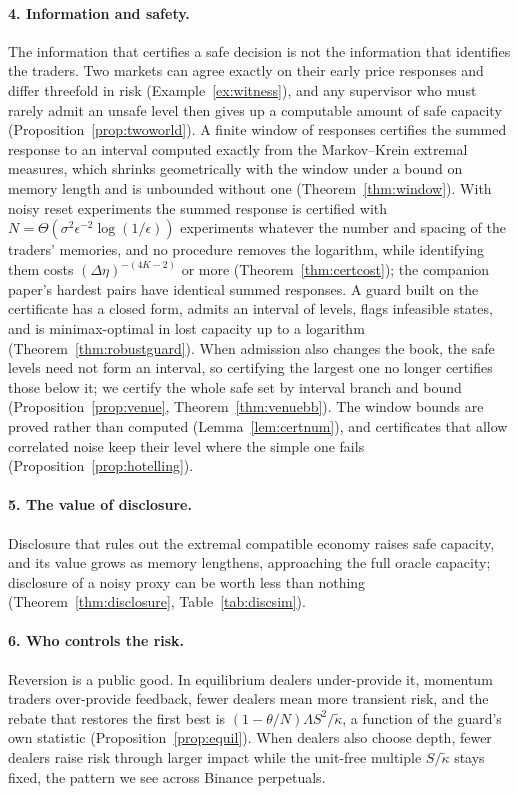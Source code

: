 \documentclass[12pt]{article}
\theoremstyle{definition}
\theoremstyle{remark}
\begin{document}
\paragraph{4. Information and safety.} The information that certifies a safe decision is not the information that identifies the traders. Two markets can agree exactly on their early price responses and differ threefold in risk (Example~\ref{ex:witness}), and any supervisor who must rarely admit an unsafe level then gives up a computable amount of safe capacity (Proposition~\ref{prop:twoworld}). A finite window of responses certifies the summed response to an interval computed exactly from the Markov--Krein extremal measures, which shrinks geometrically with the window under a bound on memory length and is unbounded without one (Theorem~\ref{thm:window}). With noisy reset experiments the summed response is certified with $N=\Theta(\sigma^2\epsilon^{-2}\log(1/\epsilon))$ experiments whatever the number and spacing of the traders' memories, and no procedure removes the logarithm, while identifying them costs $(\Delta\eta)^{-(4K-2)}$ or more (Theorem~\ref{thm:certcost}); the companion paper's hardest pairs have identical summed responses. A guard built on the certificate has a closed form, admits an interval of levels, flags infeasible states, and is minimax-optimal in lost capacity up to a logarithm (Theorem~\ref{thm:robustguard}). When admission also changes the book, the safe levels need not form an interval, so certifying the largest one no longer certifies those below it; we certify the whole safe set by interval branch and bound (Proposition~\ref{prop:venue}, Theorem~\ref{thm:venuebb}). The window bounds are proved rather than computed (Lemma~\ref{lem:certnum}), and certificates that allow correlated noise keep their level where the simple one fails (Proposition~\ref{prop:hotelling}).

\paragraph{5. The value of disclosure.} Disclosure that rules out the extremal compatible economy raises safe capacity, and its value grows as memory lengthens, approaching the full oracle capacity; disclosure of a noisy proxy can be worth less than nothing (Theorem~\ref{thm:disclosure}, Table~\ref{tab:discsim}).

\paragraph{6. Who controls the risk.} Reversion is a public good. In equilibrium dealers under-provide it, momentum traders over-provide feedback, fewer dealers mean more transient risk, and the rebate that restores the first best is $(1-\theta/N)\Lambda S^2/\tilde\kappa$, a function of the guard's own statistic (Proposition~\ref{prop:equil}). When dealers also choose depth, fewer dealers raise risk through larger impact while the unit-free multiple $S/\tilde\kappa$ stays fixed, the pattern we see across Binance perpetuals.
\end{document}
